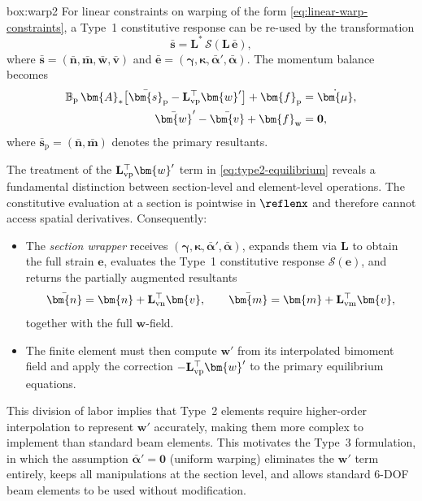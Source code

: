 \vspace{1ex}
\begin{ambox}{box:warp2}
For linear constraints on warping of the form \eqref{eq:linear-warp-constraints}, a Type~1 constitutive response can be re-used by the transformation
\[
  \bar{\bm{s}} = \mathbf{L}^*\,\mathcal{S}(\mathbf{L}\,\bar{\bm{e}}),
\]
where $\bar{\bm{s}} = (\bar{\bm{n}},\bar{\bm{m}},\bar{\bm{w}},\bar{\bm{v}})$ and
$\bar{\bm{e}} = (\bm{\gamma},\bm{\kappa},\bar{\bm{\alpha}}',\bar{\bm{\alpha}})$.
The momentum balance becomes
\begin{equation}
  \begin{aligned}
    \mathbb{B}_{\mathrm{p}}\,\bm{A}_*
      \bigl[\bar{\bm{s}}_{\mathrm{p}}
            - \mathbf{L}_{\rm vp}^{\top}\bm{w}'\bigr]
      + \bm{f}_{\mathrm{p}}
      &= \dot{\bm{\mu}},
    \\
    \bar{\bm{w}}' - \bar{\bm{v}} + \bm{f}_{\mathrm{w}}
      &= \mathbf{0},
  \end{aligned}
  \label{eq:type2-equilibrium}
\end{equation}
where $\bar{\bm{s}}_{\mathrm{p}} = (\bar{\bm{n}},\bar{\bm{m}})$ denotes the primary resultants.
\end{ambox}

\begin{remark}
The treatment of the $\mathbf{L}_{\rm vp}^{\top}\bm{w}'$ term in \eqref{eq:type2-equilibrium} reveals a fundamental distinction between section-level and element-level operations.
The constitutive evaluation at a section is pointwise in $\reflenx$ and therefore cannot access spatial derivatives.
Consequently:
\begin{itemize}
  \item The \emph{section wrapper} receives $(\bm{\gamma},\bm{\kappa},\bar{\bm{\alpha}}',\bar{\bm{\alpha}})$, expands them via $\mathbf{L}$ to obtain the full strain $\bm{e}$, evaluates the Type~1 constitutive response $\mathcal{S}(\bm{e})$, and returns the partially augmented resultants
  \[
    \bar{\bm{n}} = \bm{n} + \mathbf{L}_{\rm vn}^{\top}\bm{v}, \qquad
    \bar{\bm{m}} = \bm{m} + \mathbf{L}_{\rm vm}^{\top}\bm{v},
  \]
  together with the full $\bm{w}$-field.
  \item The finite element must then compute $\bm{w}'$ from its interpolated bimoment field and apply the correction
  $-\mathbf{L}_{\rm vp}^{\top}\bm{w}'$ to the primary equilibrium equations.
\end{itemize}
This division of labor implies that Type~2 elements require higher-order interpolation to represent $\bm{w}'$ accurately, making them more complex to implement than standard beam elements.
This motivates the Type~3 formulation, in which the assumption $\bar{\bm{\alpha}}'=\mathbf{0}$ (uniform warping) eliminates the $\bm{w}'$ term entirely, keeps all manipulations at the section level, and allows standard $6$-DOF beam elements to be used without modification.
\end{remark}
